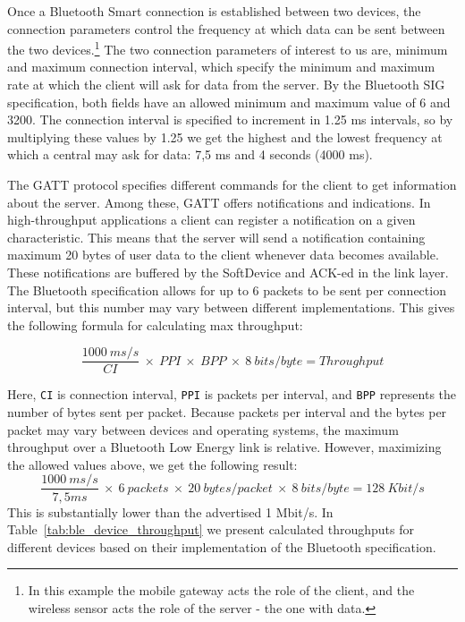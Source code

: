 Once a Bluetooth Smart connection is established between two devices, the connection parameters \cite{newRef:59} control the frequency at which data can be sent between the two devices.\footnote{ In this example the mobile gateway acts the role of the client, and the wireless sensor acts the role of the server - the one with data.} The two connection parameters of interest to us are, minimum and maximum connection interval, which specify the minimum and maximum rate at which the client will ask for data from the server. By the Bluetooth SIG specification, both fields have an allowed minimum and maximum value of 6 and 3200. The connection interval is specified to increment in 1.25 ms intervals, so by multiplying these values by 1.25 we get the highest and the lowest frequency at which a central may ask for data: 7,5 ms and 4 seconds (4000 ms).

The GATT protocol specifies different commands for the client to get information about the server. Among these, GATT offers notifications and indications. In high-throughput applications a client can register a notification on a given characteristic. This means that the server will send a notification containing maximum 20 bytes of user data to the client whenever data becomes available. These notifications are buffered by the SoftDevice and ACK-ed in the link layer. The Bluetooth specification allows for up to 6 packets to be sent per connection interval, but this number may vary between different implementations. This gives the following formula for calculating max throughput:

\[
\frac{1000\: ms/s}{CI}\: \times\: PPI\: \times\: BPP\: \times\: 8\: bits/byte = Throughput
\]

\newline
\noindent
Here, \texttt{CI} is connection interval, \texttt{PPI} is packets per interval, and \texttt{BPP} represents the number of bytes sent per packet. Because packets per interval and the bytes per packet may vary between devices and operating systems, the maximum throughput over a Bluetooth Low Energy link is relative. However, maximizing the allowed values above, we get the following result: 
\[
\frac{1000\: ms/s}{7,5ms}\: \times\: 6\: packets\: \times\: 20\:bytes/packet\: \times\: 8\: bits/byte = 128\:Kbit/s
\]
\newline
\noindent
This is substantially lower than the advertised 1 Mbit/s. In Table~\ref{tab:ble_device_throughput} we present calculated throughputs for different devices based on their implementation of the Bluetooth specification.


